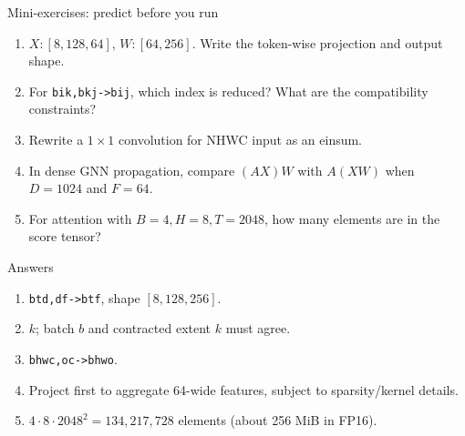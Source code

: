 \documentclass[aspectratio=169,10pt]{beamer}
\newcommand{\einsum}[1]{\texttt{#1}}
\begin{document}
\begin{frame}{Mini-exercises: predict before you run}
\small
\begin{enumerate}
 \item $X:[8,128,64]$, $W:[64,256]$. Write the token-wise projection and output shape.
 \item For \einsum{bik,bkj->bij}, which index is reduced? What are the compatibility constraints?
 \item Rewrite a $1\times1$ convolution for NHWC input as an einsum.
 \item In dense GNN propagation, compare $(AX)W$ with $A(XW)$ when $D=1024$ and $F=64$.
 \item For attention with $B=4,H=8,T=2048$, how many elements are in the score tensor?
\end{enumerate}
\begin{exampleblock}{Answers}
\begin{enumerate}
 \item \einsum{btd,df->btf}, shape $[8,128,256]$.
 \item $k$; batch $b$ and contracted extent $k$ must agree.
 \item \einsum{bhwc,oc->bhwo}.
 \item Project first to aggregate 64-wide features, subject to sparsity/kernel details.
 \item $4\cdot8\cdot2048^2=134{,}217{,}728$ elements (about 256 MiB in FP16).
\end{enumerate}
\end{exampleblock}
\end{frame}
\end{document}
